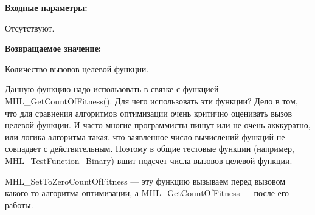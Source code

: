 \textbf{Входные параметры:}

Отсутствуют.

\textbf{Возвращаемое значение:}
 
Количество вызовов целевой функции.

Данную функцию надо использовать в связке с функцией MHL\_GetCountOfFitness(). Для чего использовать эти функции? Дело в том, что для сравнения алгоритмов оптимизации очень критично оценивать вызов целевой функции. И часто многие программисты пишут или не очень акккуратно, или логика алгоритма такая, что заявленное число вычислений функций не совпадает с действительным. Поэтому в общие тестовые функции (например, MHL\_TestFunction\_Binary) вшит подсчет числа вызовов целевой функции.

MHL\_SetToZeroCountOfFitness --- эту функцию вызываем перед вызовом какого-то алгоритма оптимизации, а MHL\_GetCountOfFitness --- после его работы.